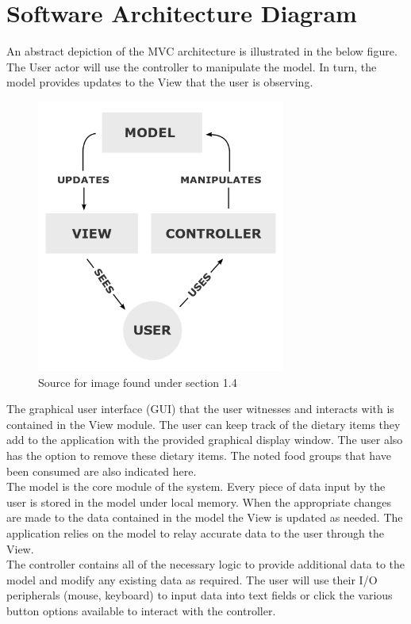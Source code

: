 \documentclass{scrreprt}
\begin{document}
\section{Software Architecture Diagram}

An abstract depiction of the MVC architecture is illustrated in the below figure. The User actor will use the controller to manipulate the model. In turn, the model provides updates to the View that the user is observing.

\begin{figure}[ht]
\centering
\includegraphics[height=9cm]{MVC-Process.png}
\caption{Source for image found under section 1.4}
\end{figure}

The graphical user interface (GUI) that the user witnesses and interacts with is contained in the View module. The user can keep track of the dietary items they add to the application with the provided graphical display window. The user also has the option to remove these dietary items. The noted food groups that have been consumed are also indicated here. \\

The model is the core module of the system. Every piece of data input by the user is stored in the model under local memory. When the appropriate changes are made to the data contained in the model the View is updated as needed. The application relies on the model to relay accurate data to the user through the View. \\

The controller contains all of the necessary logic to provide additional data to the model and modify any existing data as required. The user will use their I/O peripherals (mouse, keyboard) to input data into text fields or click the various button options available to interact with the controller. 
\end{document}
